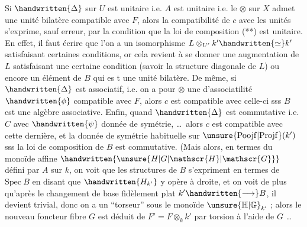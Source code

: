 Si $\handwritten{\Delta}$ sur $U$ est unitaire i.e. $A$ est unitaire i.e. le $\otimes$ sur $X$  admet une unité bilatère compatible avec $F$, alors la compatibilité de $c$ avec les unités s'exprime, sauf erreur, par la condition que la loi de composition (**) est unitaire.\deleted{\unsure{(}} En effet, il faut écrire que l'on a un isomorphisme  $L\otimes_{U'}k'\handwritten{\simeq}k'$ satisfaisant certaines conditions, or cela revient à se donner une augmentation de $L$ satisfaisant une certaine condition (savoir  la structure diagonale de $L$) ou encore un élément de $B$ qui es t une unité bilatère. De même, si $\handwritten{\Delta}$ est associatif, i.e. on a pour $\otimes$ une  d'associatilité $\handwritten{\phi}$ compatible avec $F$, alors $c$ est compatible avec celle-ci sss $B$ est une algèbre associative.  Enfin, quand $\handwritten{\Delta}$ est commutative i.e. $C$ avec $\handwritten{\psi}$ donnée de symétrie, \ldots\ alors $c$ est compatible avec cette dernière, et la donnée de symétrie habituelle sur $\unsure{\mathrm{Poojf}|\mathrm{Projf}}(k')$ sss la loi de composition de $B$ est  commutative. \handwritten{[}(Mais alors, en termes du monoïde affine $\handwritten{\unsure{H|G|\mathscr{H}|\mathscr{G}}}$ défini par $A$ sur $k$, on voit que les structures de $B$ s'expriment en termes de $\mathrm{Spec}\ B$ en disant que $\handwritten{H_{k'}}$ y opère à droite, et on voit de plus qu'après le changement
de base fidèlement plat $k'\handwritten{\longrightarrow}B$,  il devient trivial, donc on a un ``torseur'' sous le monoïde $\unsure{\mathbb{H}|\mathbb{G}}_{k'}$ ; alors le nouveau foncteur fibre $G$ est déduit de $F'=F\otimes_k k'$ par torsion à l'aide de $G$ \ldots

